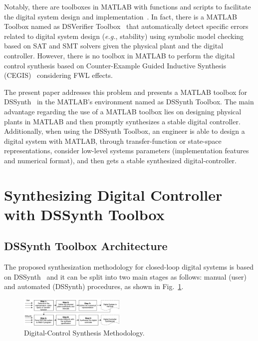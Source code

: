 \documentclass[sigconf]{acmart}
\newcommand\tool{{DSSynth Toolbox}\xspace}
\begin{document}
Notably, there are toolboxes in MATLAB with functions and scripts to facilitate the digital system design and implementation~\cite{matlab-toolbox}. In fact, there is a MATLAB Toolbox named as DSVerifier Toolbox~\cite{issta2017} that automatically detect specific errors related to digital system design ({\it e.g.}, stability) using symbolic model checking based on SAT and SMT solvers given the physical plant and the digital controller. However, there is no toolbox in MATLAB to perform the digital control synthesis based on Counter-Example Guided Inductive Synthesis (CEGIS)~\cite{DBLP:conf/asplos/Solar-LezamaTBSS06} considering FWL effects.

The present paper addresses this problem and presents a MATLAB toolbox for DSSynth~\cite{abate2017, abatecav2017} in the MATLAB's environment named as \tool. The main advantage regarding the use of a MATLAB toolbox lies on designing physical plants in MATLAB and then promptly synthesizes a stable digital controller. Additionally, when using the \tool, an engineer is able to design a digital system with MATLAB, through transfer-function or state-space representations, consider low-level systems parameters (implementation features and numerical format), and then gets a stable synthesized digital-controller.

\section{Synthesizing Digital Controller with \tool}

\subsection{\tool Architecture}

The proposed synthesization methodology for closed-loop digital systems is based on DSSynth~\cite{abate2017, abatecav2017} and it can be split into two main stages as follows: manual (user) and automated (DSSynth) procedures, as shown in Fig.~\ref{fig:synthesis-flow}. 

\begin{figure}[ht!]
\centering
\includegraphics[width=0.45\textwidth]{synthesis-flow.pdf}
\caption{Digital-Control Synthesis Methodology.}
\label{fig:synthesis-flow}
\end{figure}
\end{document}
